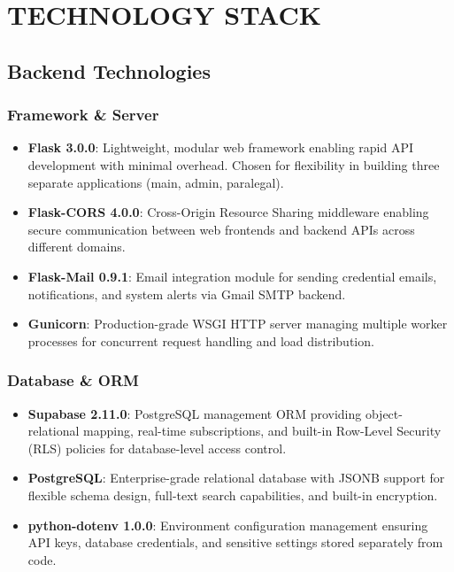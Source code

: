\section{TECHNOLOGY STACK}

\subsection{Backend Technologies}

\subsubsection{Framework \& Server}
\begin{itemize}
    \item \textbf{Flask 3.0.0}: Lightweight, modular web framework enabling rapid API development with minimal overhead. Chosen for flexibility in building three separate applications (main, admin, paralegal).
    \item \textbf{Flask-CORS 4.0.0}: Cross-Origin Resource Sharing middleware enabling secure communication between web frontends and backend APIs across different domains.
    \item \textbf{Flask-Mail 0.9.1}: Email integration module for sending credential emails, notifications, and system alerts via Gmail SMTP backend.
    \item \textbf{Gunicorn}: Production-grade WSGI HTTP server managing multiple worker processes for concurrent request handling and load distribution.
\end{itemize}

\subsubsection{Database \& ORM}
\begin{itemize}
    \item \textbf{Supabase 2.11.0}: PostgreSQL management ORM providing object-relational mapping, real-time subscriptions, and built-in Row-Level Security (RLS) policies for database-level access control.
    \item \textbf{PostgreSQL}: Enterprise-grade relational database with JSONB support for flexible schema design, full-text search capabilities, and built-in encryption.
    \item \textbf{python-dotenv 1.0.0}: Environment configuration management ensuring API keys, database credentials, and sensitive settings stored separately from code.
\end{itemize}

